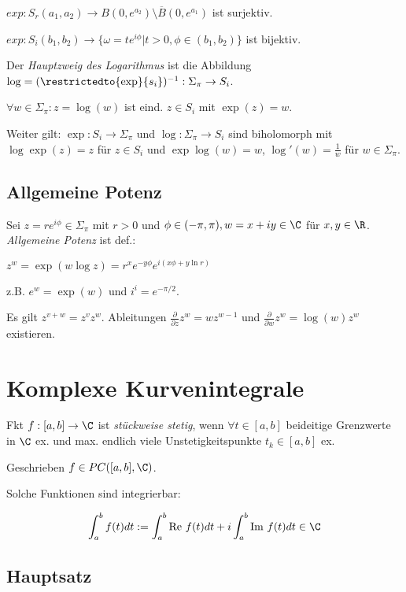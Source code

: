 \spacing

\(exp : S_r(a_1,a_2) \to B(0,e^{a_2}) \setminus \overline B(0,e^{a_1})\) ist surjektiv.

	\(exp : S_i(b_1,b_2) \to \{ \omega = te^{i\phi} | t > 0, \phi \in (b_1,b_2) \}\) ist bijektiv.

\spacing

Der \emph{Hauptzweig des Logarithmus} ist die Abbildung \(\log = (\restrictedto{\exp}{s_i})^{-1} : \Sigma_\pi \to S_i\).

	\(\forall w \in \Sigma_\pi : z = \log(w)\) ist eind. \(z \in S_i\) mit \(\exp(z) = w\).

Weiter gilt: \(\exp : S_i \to \Sigma_\pi\) und \(\log : \Sigma_\pi \to S_i\) sind biholomorph mit \(\log\exp(z) = z\) für \(z \in S_i\) und \(\exp\log(w) = w\), \(\log'(w) = \frac{1}{w}\) für \(w \in \Sigma_\pi\).

\subsection*{Allgemeine Potenz}

Sei \(z = re^{i\phi} \in \Sigma_\pi\) mit \(r > 0\) und \(\phi \in (-\pi,\pi), w = x + iy \in \C\) für \(x, y \in \R\). \emph{Allgemeine Potenz} ist def.:

				\(z^w = \exp(w \log z) = r^x e^{-y\phi} e^{i(x\phi + y \ln r)}\)

z.B. \(e^w = \exp(w)\) und \(i^i = e^{-\pi/2}\).

\spacing

Es gilt \(z^{v+w} = z^v z^w\). Ableitungen \(\frac{\partial}{\partial z} z^w = wz^{w-1}\) und \(\frac{\partial}{\partial w} z^w = \log(w)z^w\) existieren.

\section*{Komplexe Kurvenintegrale}

Fkt \(f : [a,b] \to \C\) ist \emph{stückweise stetig}, wenn \(\forall t \in [a,b]\) beideitige Grenzwerte in \(\C\) ex. und max. endlich viele Unstetigkeitspunkte \(t_k \in [a,b]\) ex.

Geschrieben \(f \in PC([a,b],\C)\).

Solche Funktionen sind integrierbar:

\vspace*{-4mm}
\[ \int_a^b f(t) dt := \int_a^b \text{Re } f(t) dt + i \int_a^b \text{Im } f(t) dt \in \C \]

\subsection*{Hauptsatz}

